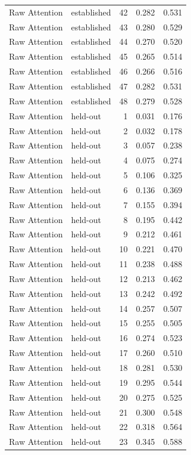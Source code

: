 \begin{tabular}{llrrr}
Raw Attention & established & 42 & 0.282 & 0.531 \\
Raw Attention & established & 43 & 0.280 & 0.529 \\
Raw Attention & established & 44 & 0.270 & 0.520 \\
Raw Attention & established & 45 & 0.265 & 0.514 \\
Raw Attention & established & 46 & 0.266 & 0.516 \\
Raw Attention & established & 47 & 0.282 & 0.531 \\
Raw Attention & established & 48 & 0.279 & 0.528 \\
Raw Attention & held-out & 1 & 0.031 & 0.176 \\
Raw Attention & held-out & 2 & 0.032 & 0.178 \\
Raw Attention & held-out & 3 & 0.057 & 0.238 \\
Raw Attention & held-out & 4 & 0.075 & 0.274 \\
Raw Attention & held-out & 5 & 0.106 & 0.325 \\
Raw Attention & held-out & 6 & 0.136 & 0.369 \\
Raw Attention & held-out & 7 & 0.155 & 0.394 \\
Raw Attention & held-out & 8 & 0.195 & 0.442 \\
Raw Attention & held-out & 9 & 0.212 & 0.461 \\
Raw Attention & held-out & 10 & 0.221 & 0.470 \\
Raw Attention & held-out & 11 & 0.238 & 0.488 \\
Raw Attention & held-out & 12 & 0.213 & 0.462 \\
Raw Attention & held-out & 13 & 0.242 & 0.492 \\
Raw Attention & held-out & 14 & 0.257 & 0.507 \\
Raw Attention & held-out & 15 & 0.255 & 0.505 \\
Raw Attention & held-out & 16 & 0.274 & 0.523 \\
Raw Attention & held-out & 17 & 0.260 & 0.510 \\
Raw Attention & held-out & 18 & 0.281 & 0.530 \\
Raw Attention & held-out & 19 & 0.295 & 0.544 \\
Raw Attention & held-out & 20 & 0.275 & 0.525 \\
Raw Attention & held-out & 21 & 0.300 & 0.548 \\
Raw Attention & held-out & 22 & 0.318 & 0.564 \\
Raw Attention & held-out & 23 & 0.345 & 0.588 \\

\end{tabular}
